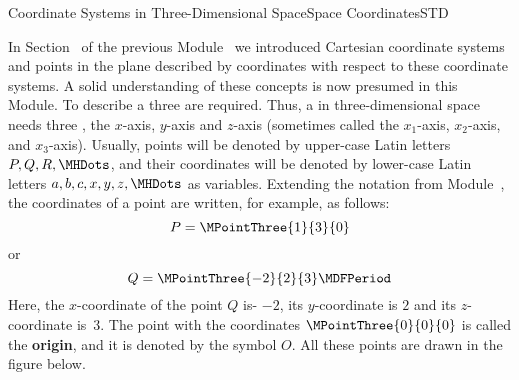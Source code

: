 \begin{MXContent}{Coordinate Systems in Three-Dimensional Space}{Space Coordinates}{STD}

In Section~ of the previous Module~ we introduced Cartesian coordinate systems
and points in the plane described by coordinates with respect to these coordinate systems. A solid understanding
of these concepts is now presumed in this Module. To describe a 
three  are required. Thus, a 
 in three-dimensional space needs 
three , the $x$-axis, $y$-axis and $z$-axis 
(sometimes called the $x_1$-axis, $x_2$-axis, and $x_3$-axis). Usually, points will be denoted by 
upper-case Latin letters $P,Q,R,\MHDots$, and their coordinates will be denoted by lower-case Latin letters 
$a,b,c,x,y,z,\MHDots$ as variables. Extending the notation from Module~, the coordinates of a 
point are written, for example, as follows:
\[
 P=\MPointThree{1}{3}{0}
\]
or
\[
 Q=\MPointThree{-2}{2}{3}\MDFPeriod
\]
Here, the $x$-coordinate of the point $Q$ is- $-2$, its $y$-coordinate is $2$ and its $z$-coordinate is~$3$.
The point with the coordinates $\MPointThree{0}{0}{0}$ is called the \textbf{origin}, and it is denoted by the symbol
$O$. All these points are drawn in the figure below.


\end{MXContent}
